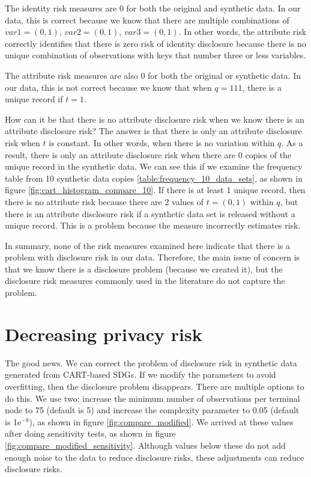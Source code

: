 \documentclass[runningheads]{llncs}
\begin{document}
The identity risk measures are 0 for both the original and synthetic data.  In our data, this is correct because we know that there are multiple combinations of $var1=(0,1)$, $var2=(0,1)$, $var3=(0,1)$.  In other words, the attribute risk correctly identifies that there is zero risk of identity disclosure because there is no unique combination of observations with keys that number three or less variables.

The attribute risk measures are also 0 for both the original or synthetic data.  In our data, this is not correct because we know that when $q=111$, there is a unique record if $t=1$.  

How can it be that there is no attribute disclosure risk when we know there is an attribute disclosure risk?  The answer is that there is only an attribute disclosure risk when $t$ is constant.  In other words, when there is no variation within $q$.  As a result, there is only an attribute disclosure risk when there are 0 copies of the unique record in the synthetic data.  We can see this if we examine the frequency table from 10 synthetic data copies \ref{table:frequency_10_data_sets}, as shown in figure \ref{fig:cart_histogram_compare_10}.  If there is at least 1 unique record, then there is no attribute risk because there are 2 values of $t=(0,1)$ within $q$, but there is an attribute disclosure risk if a synthetic data set is released without a unique record.  This is a problem because the measure incorrectly estimates risk.

In summary, none of the risk measures examined here indicate that there is a problem with disclosure risk in our data.  Therefore, the main issue of concern is that we know there is a disclosure problem (because we created it), but the disclosure risk measures commonly used in the literature do not capture the problem.  

\section{Decreasing privacy risk}

The good news.  We can correct the problem of disclosure risk in synthetic data generated from CART-based SDGs.  If we modify the parameters to avoid overfitting, then the disclosure problem disappears.  There are multiple options to do this.  We use two: increase the minimum number of observations per terminal node to 75 (default is 5) and increase the complexity parameter to 0.05 (default is 1e$^{-8}$), as shown in figure \ref{fig:compare_modified}.  We arrived at these values after doing sensitivity tests, as shown in figure \ref{fig:compare_modified_sensitivity}.  Although values below these do not add enough noise to the data to reduce disclosure risks, these adjustments can reduce disclosure risks.
\end{document}
